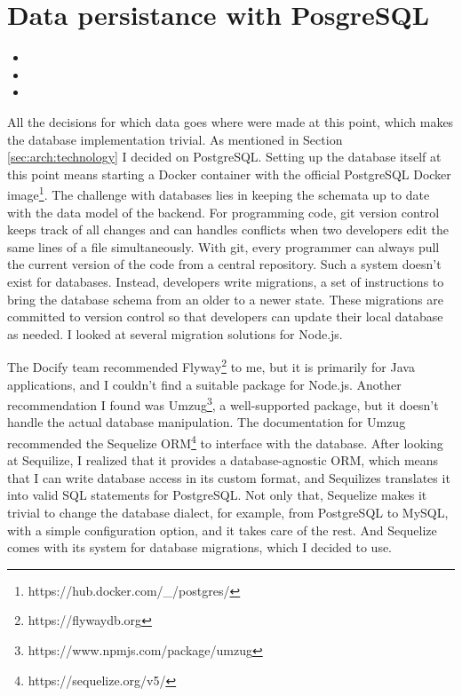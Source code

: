 \section{Data persistance with PosgreSQL}

\begin{itemize}
  \item {}
  \item {}
  \item {}
\end{itemize}

All the decisions for which data goes where were made at this point, which makes the database implementation trivial. As mentioned in Section \ref{sec:arch:technology} I decided on PostgreSQL. Setting up the database itself at this point means starting a Docker container with the official PostgreSQL Docker image\footnote{https://hub.docker.com/_/postgres/}. The challenge with databases lies in keeping the schemata up to date with the data model of the backend. For programming code, git version control keeps track of all changes and can handles conflicts when two developers edit the same lines of a file simultaneously. With git, every programmer can always pull the current version of the code from a central repository. Such a system doesn't exist for databases. Instead, developers write migrations, a set of instructions to bring the database schema from an older to a newer state. These migrations are committed to version control so that developers can update their local database as needed. I looked at several migration solutions for Node.js.

The Docify team recommended Flyway\footnote{https://flywaydb.org} to me, but it is primarily for Java applications, and I couldn't find a suitable package for Node.js. Another recommendation I found was Umzug\footnote{https://www.npmjs.com/package/umzug}, a well-supported package, but it doesn't handle the actual database manipulation. The documentation for Umzug recommended the Sequelize ORM\footnote{https://sequelize.org/v5/} to interface with the database. After looking at Sequilize, I realized that it provides a database-agnostic ORM, which means that I can write database access in its custom format, and Sequilizes translates it into valid SQL statements for PostgreSQL. Not only that, Sequelize makes it trivial to change the database dialect, for example, from PostgreSQL to MySQL, with a simple configuration option, and it takes care of the rest. And Sequelize comes with its system for database migrations, which I decided to use.


